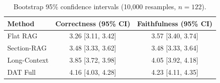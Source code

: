 \begin{table}[t]
\centering
\caption{Bootstrap 95\% confidence intervals (10{,}000 resamples, $n=122$).}
\label{tab:bootstrap}
\begin{tabular}{lcc}
\toprule
\textbf{Method} & \textbf{Correctness (95\% CI)} & \textbf{Faithfulness (95\% CI)} \\
\midrule
Flat RAG & 3.26 [3.11, 3.42] & 3.57 [3.40, 3.74] \\
Section-RAG & 3.48 [3.33, 3.62] & 3.48 [3.33, 3.64] \\
Long-Context & 3.85 [3.72, 3.98] & 4.05 [3.92, 4.18] \\
DAT Full & 4.16 [4.03, 4.28] & 4.23 [4.11, 4.35] \\
\bottomrule
\end{tabular}
\end{table}
